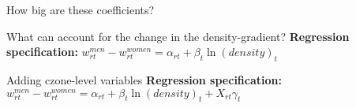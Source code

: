 \begin{frame}{How big are these coefficients?}  
		
\end{frame}

\begin{frame}{What can account for the change in the density-gradient?}
	\label{slide:controls}
	\textbf{\alert{Regression specification:}} $w^{men}_{rt}-w^{women}_{rt}=\alpha_{rt}+\beta_{t}\ln(density)_t$
	
\end{frame}

\begin{frame}{Adding czone-level variables}
	\label{slide:cz_controls}
	\textbf{\alert{Regression specification:}} $w^{men}_{rt}-w^{women}_{rt}=\alpha_{rt}+\beta_{t}\ln(density)_t+X_{rt}\gamma_t$
	
\end{frame}